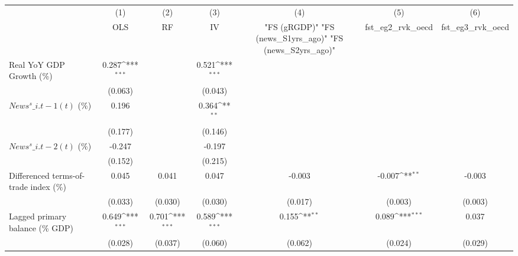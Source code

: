 {
\def\sym#1{\ifmmode^{#1}\else\(^{#1}\)\fi}
\begin{tabular}{l*{6}{c}}
\toprule
                    &\multicolumn{1}{c}{(1)}&\multicolumn{1}{c}{(2)}&\multicolumn{1}{c}{(3)}&\multicolumn{1}{c}{(4)}&\multicolumn{1}{c}{(5)}&\multicolumn{1}{c}{(6)}\\
                    &\multicolumn{1}{c}{OLS}&\multicolumn{1}{c}{RF}&\multicolumn{1}{c}{IV}&\multicolumn{1}{c}{ "FS (gRGDP)"  "FS (news\_S1yrs\_ago)"  "FS (news\_S2yrs\_ago)" }&\multicolumn{1}{c}{fst\_eg2\_rvk\_oecd}&\multicolumn{1}{c}{fst\_eg3\_rvk\_oecd}\\
\midrule
Real YoY GDP Growth (\%)&       0.287\sym{***}&                     &       0.521\sym{***}&                     &                     &                     \\
                    &     (0.063)         &                     &     (0.043)         &                     &                     &                     \\
\addlinespace
$ News^s\_{i.t-1}(t)$ (\%)&       0.196         &                     &       0.364\sym{**} &                     &                     &                     \\
                    &     (0.177)         &                     &     (0.146)         &                     &                     &                     \\
\addlinespace
$ News^s\_{i.t-2}(t)$ (\%)&      -0.247         &                     &      -0.197         &                     &                     &                     \\
                    &     (0.152)         &                     &     (0.215)         &                     &                     &                     \\
\addlinespace
Differenced terms-of-trade index (\%)&       0.045         &       0.041         &       0.047         &      -0.003         &      -0.007\sym{**} &      -0.003         \\
                    &     (0.033)         &     (0.030)         &     (0.030)         &     (0.017)         &     (0.003)         &     (0.003)         \\
\addlinespace
Lagged primary balance (\% GDP)&       0.649\sym{***}&       0.701\sym{***}&       0.589\sym{***}&       0.155\sym{**} &       0.089\sym{***}&       0.037         \\
                    &     (0.028)         &     (0.037)         &     (0.060)         &     (0.062)         &     (0.024)         &     (0.029)         \\

\end{tabular}}
